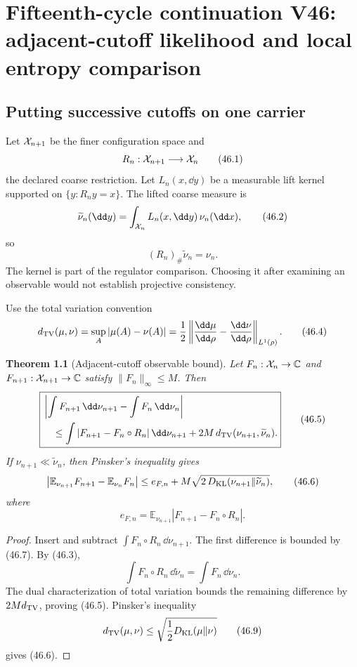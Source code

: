 \documentclass[11pt]{article}
\newtheorem{theorem}{Theorem}[section]
\theoremstyle{remark}
\begin{document}
\chapter{Fifteenth-cycle continuation V46: adjacent-cutoff likelihood and local entropy comparison}
\label{sec:v15v46}

\section{Putting successive cutoffs on one carrier}

Let \({\cal X}_{n+1}\) be the finer configuration space and
\[
 R_n:{\cal X}_{n+1}\longrightarrow{\cal X}_n            \tag{46.1}
\]
the declared coarse restriction.  Let \(L_n(x,\dd y)\) be a
measurable lift kernel supported on
\(\{y:R_ny=x\}\).  The lifted coarse measure is
\[
 \widetilde\nu_n(\dd y)
 =\int_{{\cal X}_n}L_n(x,\dd y)\,\nu_n(\dd x),           \tag{46.2}
\]
so
\[
 (R_n)_\#\widetilde\nu_n=\nu_n.                         \tag{46.3}
\]
The kernel is part of the regulator comparison.  Choosing it after
examining an observable would not establish projective consistency.

Use the total variation convention
\[
 d_{\rm TV}(\mu,\nu)=\sup_A|\mu(A)-\nu(A)|
 =\frac12\left\|\frac{\dd\mu}{\dd\rho}
              -\frac{\dd\nu}{\dd\rho}\right\|_{L^1(\rho)}.
                                                               \tag{46.4}
\]

\begin{theorem}[Adjacent-cutoff observable bound]
\label{thm:v15v46-adjacent}
Let \(F_n:{\cal X}_n\to\mathbb C\) and
\(F_{n+1}:{\cal X}_{n+1}\to\mathbb C\) satisfy
\(\|F_n\|_\infty\leq M\).  Then
\[
 \boxed{
 \begin{split}
 &\left|
 \int F_{n+1}\,\dd\nu_{n+1}
 -\int F_n\,\dd\nu_n\right|\\
 &\quad\leq
 \int|F_{n+1}-F_n\circ R_n|\,\dd\nu_{n+1}
 +2M\,d_{\rm TV}(\nu_{n+1},\widetilde\nu_n).
 \end{split}}                                           \tag{46.5}
\]
If \(\nu_{n+1}\ll\widetilde\nu_n\), then Pinsker's inequality gives
\[
 \left|\mathbb E_{\nu_{n+1}}F_{n+1}
       -\mathbb E_{\nu_n}F_n\right|
 \leq e_{F,n}
 +M\sqrt{2\,D_{\rm KL}(\nu_{n+1}\Vert\widetilde\nu_n)}, \tag{46.6}
\]
where
\[
 e_{F,n}=
 \mathbb E_{\nu_{n+1}}
 |F_{n+1}-F_n\circ R_n|.                                \tag{46.7}
\]
\end{theorem}

\begin{proof}
Insert and subtract
\(\int F_n\circ R_n\,\dd\nu_{n+1}\).  The first difference is
bounded by (46.7).  By (46.3),
\[
 \int F_n\circ R_n\,\dd\widetilde\nu_n
 =\int F_n\,\dd\nu_n.                                   \tag{46.8}
\]
The dual characterization of total variation bounds the remaining
difference by \(2M d_{\rm TV}\), proving (46.5).  Pinsker's
inequality
\[
 d_{\rm TV}(\mu,\nu)
 \leq\sqrt{\frac12D_{\rm KL}(\mu\Vert\nu)}               \tag{46.9}
\]
gives (46.6).
\end{proof}
\end{document}
